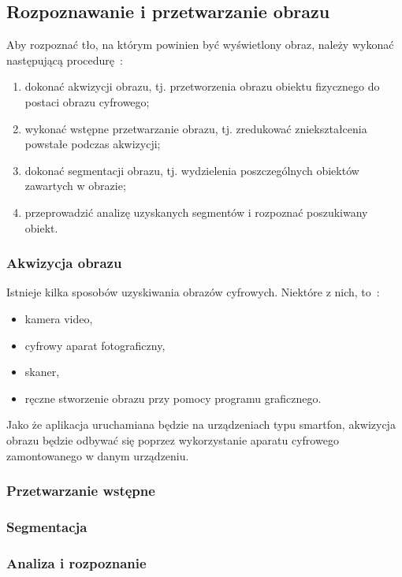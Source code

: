 \subsection{Rozpoznawanie i przetwarzanie obrazu}
Aby rozpoznać tło, na którym powinien być wyświetlony obraz, należy wykonać następującą procedurę~\cite{graf:przet:obr}:
\begin{enumerate}
 \item dokonać akwizycji obrazu, tj. przetworzenia obrazu obiektu fizycznego do postaci obrazu cyfrowego;
 \item wykonać wstępne przetwarzanie obrazu, tj. zredukować zniekształcenia powstałe podczas akwizycji;
 \item dokonać segmentacji obrazu, tj. wydzielenia poszczególnych obiektów zawartych w obrazie;
 \item przeprowadzić analizę uzyskanych segmentów i rozpoznać poszukiwany obiekt.
\end{enumerate}

\subsubsection{Akwizycja obrazu}
Istnieje kilka sposobów uzyskiwania obrazów cyfrowych.
Niektóre z nich, to~\cite{anal:przet:obr}:
\begin{itemize}
 \item kamera video,
 \item cyfrowy aparat fotograficzny,
 \item skaner,
 \item ręczne stworzenie obrazu przy pomocy programu graficznego.
\end{itemize}

Jako że aplikacja uruchamiana będzie na urządzeniach typu smartfon, akwizycja obrazu będzie odbywać się poprzez wykorzystanie aparatu cyfrowego zamontowanego w danym urządzeniu.

\subsubsection{Przetwarzanie wstępne}

\subsubsection{Segmentacja}

\subsubsection{Analiza i rozpoznanie}


